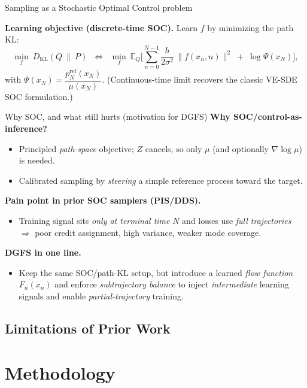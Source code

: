 \documentclass[aspectratio=169,xcolor=dvipsnames]{beamer}
\begin{document}
\begin{frame}[t]{Sampling as a Stochastic Optimal Control problem}
\footnotesize

\medskip
\textbf{Learning objective (discrete-time SOC).} Learn $f$ by minimizing the path KL:
\[
\min_{f}\ D_{\mathrm{KL}}(Q\ \|\ P)
\;\;\Longleftrightarrow\;\;
\min_{f}\ \mathbb E_{Q}\!\Big[\sum_{n=0}^{N-1}\frac{h}{2\sigma^2}\,\|f(x_n,n)\|^2\;+\;\log\Psi(x_N)\Big],
\]
with \(\Psi(x_N)=\dfrac{p_N^{\text{ref}}(x_N)}{\mu(x_N)}\).
(Continuous-time limit recovers the classic VE-SDE SOC formulation.)
\end{frame}

\begin{frame}[t]{Why SOC, and what still hurts (motivation for DGFS)}
\footnotesize
\textbf{Why SOC/control-as-inference?}
\begin{itemize}\itemsep3pt
  \item Principled \emph{path-space} objective; $Z$ cancels, so only $\mu$ (and optionally $\nabla\log\mu$) is needed.
  \item Calibrated sampling by \emph{steering} a simple reference process toward the target.
\end{itemize}

\textbf{Pain point in prior SOC samplers (PIS/DDS).}
\begin{itemize}\itemsep3pt
  \item Training signal sits \emph{only at terminal time} $N$ and losses use \emph{full trajectories} $\Rightarrow$ poor credit assignment, high variance, weaker mode coverage.
\end{itemize}

\textbf{DGFS in one line.}
\begin{itemize}\itemsep3pt
  \item Keep the same SOC/path-KL setup, but introduce a learned \emph{flow function} $F_n(x_n)$ and enforce \emph{subtrajectory balance} to inject \emph{intermediate} learning signals and enable \emph{partial-trajectory} training.
\end{itemize}
\end{frame}



\subsection{Limitations of Prior Work}




\section{Methodology}
\end{document}
